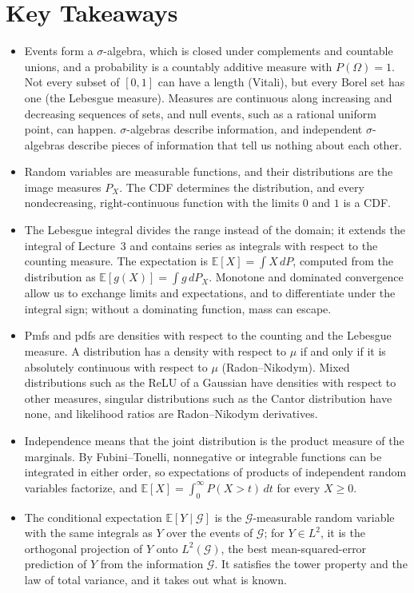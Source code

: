 \documentclass[11pt]{article}
\newcommand{\E}{\mathbb{E}}
\theoremstyle{definition}
\theoremstyle{plain}
\theoremstyle{remark}
\begin{document}
\section*{Key Takeaways}
\begin{itemize}[leftmargin=*]
    \item Events form a $\sigma$-algebra, which is closed under complements and countable unions, and a probability is a countably additive measure with $P(\Omega) = 1$. Not every subset of $[0, 1]$ can have a length (Vitali), but every Borel set has one (the Lebesgue measure). Measures are continuous along increasing and decreasing sequences of sets, and null events, such as a rational uniform point, can happen. $\sigma$-algebras describe information, and independent $\sigma$-algebras describe pieces of information that tell us nothing about each other.
    \item Random variables are measurable functions, and their distributions are the image measures $P_X$. The CDF determines the distribution, and every nondecreasing, right-continuous function with the limits $0$ and $1$ is a CDF.
    \item The Lebesgue integral divides the range instead of the domain; it extends the integral of Lecture~3 and contains series as integrals with respect to the counting measure. The expectation is $\E[X] = \int X\, dP$, computed from the distribution as $\E[g(X)] = \int g\, dP_X$. Monotone and dominated convergence allow us to exchange limits and expectations, and to differentiate under the integral sign; without a dominating function, mass can escape.
    \item Pmfs and pdfs are densities with respect to the counting and the Lebesgue measure. A distribution has a density with respect to $\mu$ if and only if it is absolutely continuous with respect to $\mu$ (Radon--Nikodym). Mixed distributions such as the ReLU of a Gaussian have densities with respect to other measures, singular distributions such as the Cantor distribution have none, and likelihood ratios are Radon--Nikodym derivatives.
    \item Independence means that the joint distribution is the product measure of the marginals. By Fubini--Tonelli, nonnegative or integrable functions can be integrated in either order, so expectations of products of independent random variables factorize, and $\E[X] = \int_0^\infty P(X > t)\, dt$ for every $X \geq 0$.
    \item The conditional expectation $\E[Y \mid \mathcal{G}]$ is the $\mathcal{G}$-measurable random variable with the same integrals as $Y$ over the events of $\mathcal{G}$; for $Y \in L^2$, it is the orthogonal projection of $Y$ onto $L^2(\mathcal{G})$, the best mean-squared-error prediction of $Y$ from the information $\mathcal{G}$. It satisfies the tower property and the law of total variance, and it takes out what is known.

\end{itemize}
\end{document}
